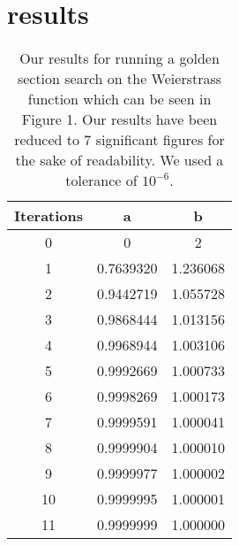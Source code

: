 \documentclass[linenumbers,RNAAS,trackchanges]{aastex631}
\begin{document}
\section{\textbf{results}}
\begin{table}[H]
    \centering
    \begin{tabular}{|c|c|c|}
         \hline
         Iterations &  a & b \\
         \hline
         0 & 0 & 2 \\
         \hline
         1 & 0.7639320 & 1.236068 \\
         \hline
         2 & 0.9442719 & 1.055728 \\
         \hline
         3 & 0.9868444 & 1.013156 \\
         \hline
         4 & 0.9968944 & 1.003106 \\
         \hline
         5 & 0.9992669 & 1.000733 \\
         \hline
         6 & 0.9998269 & 1.000173 \\
         \hline
         7 & 0.9999591 & 1.000041 \\
         \hline
         8 & 0.9999904 & 1.000010 \\
         \hline
         9 & 0.9999977 & 1.000002 \\
         \hline
         10 & 0.9999995 & 1.000001 \\
         \hline
         11 & 0.9999999 & 1.000000 \\
         \hline
    \end{tabular}
    \caption{Our results for running a golden section search on the Weierstrass function which can be seen in Figure 1. Our results have been reduced to 7 significant figures for the sake of readability. We used a tolerance of $10^{-6}$.}
    \label{tab:data_tab}
\end{table}
\end{document}
